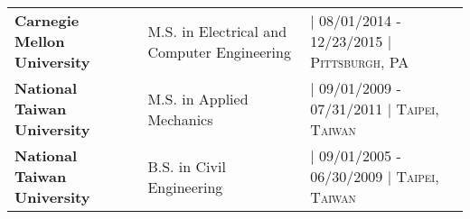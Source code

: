 \begin{flushleft}
\begin{tabular}{@{}p{5.5cm} l p{6.5cm}@{}}
\textbf{Carnegie Mellon University} &
M.S. in Electrical and Computer Engineering & 
{\hfill\footnotesize\textsc{| 08/01/2014 - 12/23/2015 | Pittsburgh, PA}} \\

\textbf{National Taiwan University} & 
M.S. in Applied Mechanics & 
{\hfill\footnotesize\textsc{| 09/01/2009 - 07/31/2011 | Taipei, Taiwan}} \\

\textbf{National Taiwan University} &
B.S. in Civil Engineering & 
{\hfill\footnotesize\textsc{| 09/01/2005 - 06/30/2009 | Taipei, Taiwan}}
\end{tabular}
\end{flushleft}